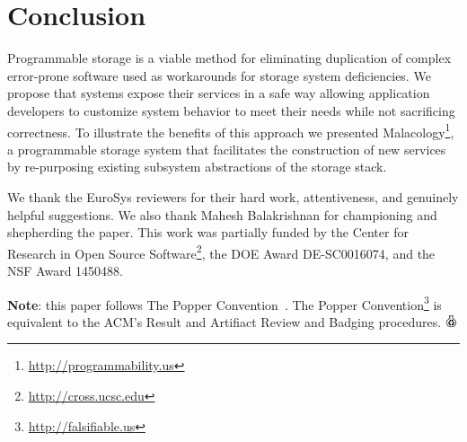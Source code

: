 \section{Conclusion}
\label{conclusion-and-future-work}

Programmable storage is a viable method for eliminating duplication of complex
error-prone software used as workarounds for storage system deficiencies. We
propose that systems expose their services in a safe way allowing application
developers to customize system behavior to meet their needs while not
sacrificing correctness. To illustrate the benefits of this approach we
presented Malacology\footnote{\url{http://programmability.us}}, a
programmable storage system that facilitates the construction of new services
by re-purposing existing subsystem abstractions of the storage stack. 


\acks

We thank the EuroSys reviewers for their hard work, attentiveness, and
genuinely helpful suggestions. We also thank Mahesh Balakrishnan for
championing and shepherding the paper. This work was partially funded by the
Center for Research in Open Source
Software\footnote{\url{http://cross.ucsc.edu}}, the DOE Award
DE-SC0016074, and the NSF Award 1450488.

\textbf{Note}: this paper follows The Popper
Convention~\cite{jimenez_popper_2016}. The Popper
Convention\footnote{\url{http://falsifiable.us}} is equivalent to
the ACM's Result and Artifiact Review and Badging procedures.
\includegraphics[width=3.5mm]{figures/popper.png}

